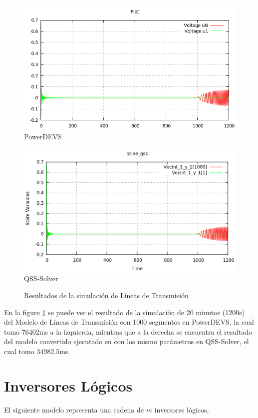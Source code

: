 \begin{figure}[H]
\centering
\begin{minipage}{0.5\textwidth}
\includegraphics[width=\linewidth]{lcline-pd}
PowerDEVS\\
\end{minipage}\hfill
\begin{minipage}{0.5\textwidth}
 \includegraphics[width=\linewidth]{lcline-qss}
QSS-Solver\\
\end{minipage}
\caption{Resultados de la simulación de Líneas de Transmisión}
\label{graph:lclines}
\end{figure}

En la figure \ref{graph:lclines} se puede ver el resultado de la simulación de 20 minutos (1200s) del Modelo de Líneas de Transmisión con 1000 segmentos en PowerDEVS,
	la cual tomo 76402ms a la izquierda, mientras que a la derecha se encuentra el resultado del modelo convertido ejecutado en con los mismo parámetros en
	QSS-Solver, el cual tomo 34982.5ms.

\section{Inversores Lógicos}
	El siguiente modelo representa una cadena de $m$ inversores lógicos, 

